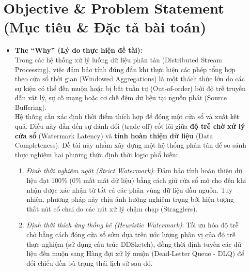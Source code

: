 \documentclass[12pt,a4paper]{article}
\begin{document}
\section{Objective \& Problem Statement (Mục tiêu \& Đặc tả bài toán)}
\begin{itemize}[leftmargin=*]
    \item \textbf{The ``Why'' (Lý do thực hiện đề tài):} \\
    Trong các hệ thống xử lý luồng dữ liệu phân tán (Distributed Stream Processing), việc đảm bảo tính đúng đắn khi thực hiện các phép tổng hợp theo cửa sổ thời gian (Windowed Aggregations) là một thách thức lớn do các sự kiện có thể đến muộn hoặc bị bất tuần tự (Out-of-order) bởi độ trễ truyền dẫn vật lý, sự cố mạng hoặc cơ chế đệm dữ liệu tại nguồn phát (Source Buffering). \\
    Hệ thống cần xác định thời điểm thích hợp để đóng một cửa sổ và xuất kết quả. Điều này dẫn đến sự đánh đổi (trade-off) cốt lõi giữa \textbf{độ trễ chờ xử lý cửa sổ} (Watermark Latency) và \textbf{tính hoàn thiện dữ liệu} (Data Completeness). Đề tài này nhằm xây dựng một hệ thống phân tán để so sánh thực nghiệm hai phương thức định thời logic phổ biến:
    \begin{enumerate}
        \item \textit{Định thời nghiêm ngặt (Strict Watermark)}: Đảm bảo tính hoàn thiện dữ liệu đạt 100\% (0\% mất mát dữ liệu) bằng cách giữ cửa sổ mở cho đến khi nhận được xác nhận từ tất cả các phân vùng dữ liệu đầu nguồn. Tuy nhiên, phương pháp này chịu ảnh hưởng nghiêm trọng bởi hiện tượng thắt nút cổ chai do các nút xử lý chậm chạp (Stragglers).
        \item \textit{Định thời thích ứng thống kê (Heuristic Watermark)}: Tối ưu hóa độ trễ chờ bằng cách đóng cửa sổ sớm dựa trên ước lượng phân vị của độ trễ thực nghiệm (sử dụng cấu trúc DDSketch), đồng thời định tuyến các dữ liệu đến muộn sang Hàng đợi xử lý muộn (Dead-Letter Queue - DLQ) để đối chiếu đền bù trạng thái lịch sử sau đó.
    \end{enumerate}


\end{itemize}
\end{document}
